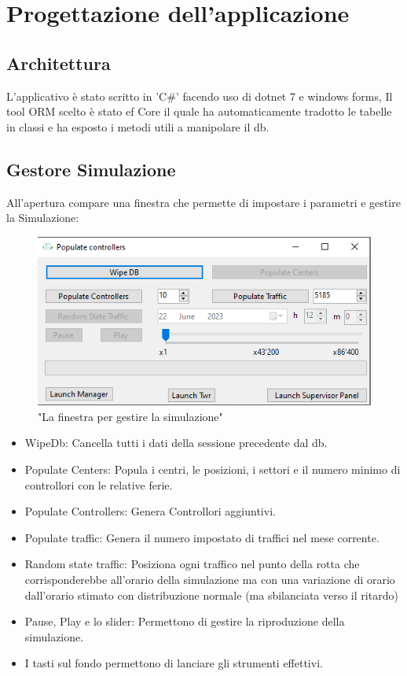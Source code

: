 \chapter{Progettazione dell'applicazione}
\section{Architettura}
L'applicativo è stato scritto in 'C\#' facendo uso di dotnet 7 e windows forms,
Il tool ORM scelto è stato ef Core il quale ha automaticamente tradotto le tabelle in classi e ha esposto i metodi utili a manipolare il db.
\section{Gestore Simulazione}
All'apertura compare una finestra che permette di impostare i parametri e gestire la Simulazione:
\begin{figure}[H]
     \centering
     \includegraphics[width=1\textwidth]{figures/Sim.PNG}
     \caption{"La finestra per gestire la simulazione"}
   \end{figure}

\begin{itemize}
     \item WipeDb: Cancella tutti i dati della sessione precedente dal db.
     \item Populate Centers: Popula i centri, le posizioni, i settori e il numero minimo di controllori con le relative ferie.
     \item Populate Controllers: Genera Controllori aggiuntivi.
     \item Populate traffic: Genera il numero impostato di traffici nel mese corrente.
     \item Random state traffic: Posiziona ogni traffico nel punto della rotta che corrisponderebbe all'orario della simulazione ma con una variazione di orario dall'orario stimato con distribuzione normale (ma sbilanciata verso il ritardo)
     \item Pause, Play e lo slider: Permettono di gestire la riproduzione della simulazione.
     \item I tasti sul fondo permettono di lanciare gli strumenti effettivi. 
\end{itemize}
